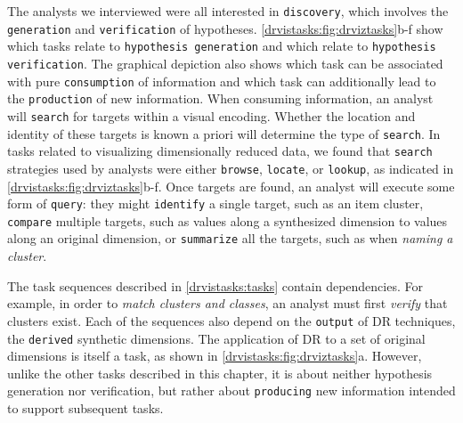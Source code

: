 The analysts we interviewed were all interested in {\tt discovery}, which involves the {\tt generation} and {\tt verification} of hypotheses. 
\autoref{drvistasks:fig:drviztasks}b-f show which tasks relate to {\tt hypothesis generation} and which relate to {\tt hypothesis verification}. 
The graphical depiction also shows which task can be associated with pure {\tt consumption} of information and which task can additionally lead to the {\tt production} of new information.
When consuming information, an analyst will {\tt search} for targets within a visual encoding.
Whether the location and identity of these targets is known a priori will determine the type of {\tt search}. 
In tasks related to visualizing dimensionally reduced data, we found that {\tt search} strategies used by analysts were either {\tt browse}, {\tt locate}, or {\tt lookup}, as indicated in \autoref{drvistasks:fig:drviztasks}b-f. 
Once targets are found, an analyst will execute some form of {\tt query}: they might {\tt identify} a single target, such as an item cluster, {\tt compare} multiple targets, such as values along a synthesized dimension to values along an original dimension, or {\tt summarize} all the targets, such as when {\it naming a cluster}. 

The task sequences described in \autoref{drvistasks:tasks} contain dependencies. 
For example, in order to {\it match clusters and classes}, an analyst must first {\it verify} that clusters exist. 
Each of the sequences also depend on the {\tt output} of \ac{DR} techniques, the {\tt derived} synthetic dimensions.  
The application of \ac{DR} to a set of original dimensions is itself a task, as shown in \autoref{drvistasks:fig:drviztasks}a. 
However, unlike the other tasks described in this chapter, it is about neither hypothesis generation nor verification, but rather about {\tt producing} new information intended to support subsequent tasks.

